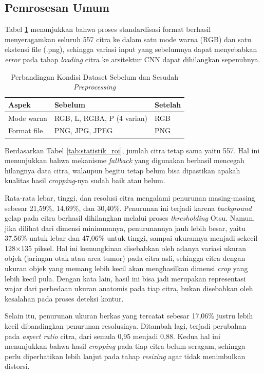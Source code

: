 \subsection{Pemrosesan Umum}
Tabel \ref{tab:preprocessing} menunjukkan bahwa proses standardisasi format berhasil menyeragamkan seluruh 557 citra ke dalam satu mode warna (RGB) dan satu ekstensi file (.png), sehingga variasi input yang sebelumnya dapat menyebabkan \textit{error} pada tahap \textit{loading} citra ke arsitektur CNN dapat dihilangkan sepenuhnya.

\begin{table}[htbp]
	\centering
	\caption{Perbandingan Kondisi Dataset Sebelum dan Sesudah \textit{Preprocessing}}
	\label{tab:preprocessing}
	\begin{tabular}{|l|l|l|}
		\hline
		\textbf{Aspek} & \textbf{Sebelum} & \textbf{Setelah} \\ \hline
		Mode warna & RGB, L, RGBA, P (4 varian) & RGB \\ \hline
		Format file & PNG, JPG, JPEG & PNG \\ \hline
	\end{tabular}
\end{table}

Berdasarkan Tabel \ref{tab:statistik_roi}, jumlah citra tetap sama yaitu 557. Hal ini menunjukkan bahwa mekanisme \textit{fallback} yang digunakan berhasil mencegah hilangnya data citra, walaupun begitu tetap belum bisa dipastikan apakah kualitas hasil \textit{cropping}-nya sudah baik atau belum.

Rata-rata lebar, tinggi, dan resolusi citra mengalami penurunan masing-masing sebesar 21,59\%, 14,69\%, dan 30,40\%. Penurunan ini terjadi karena \textit{background} gelap pada citra berhasil dihilangkan melalui proses \textit{thresholding} Otsu. Namun, jika dilihat dari dimensi minimumnya, penurunannya jauh lebih besar, yaitu 37,56\% untuk lebar dan 47,06\% untuk tinggi, sampai ukurannya menjadi sekecil 128×135 piksel. Hal ini kemungkinan disebabkan oleh adanya variasi ukuran objek (jaringan otak atau area tumor) pada citra asli, sehingga citra dengan ukuran objek yang memang lebih kecil akan menghasilkan dimensi \textit{crop} yang lebih kecil pula. Dengan kata lain, hasil ini bisa jadi merupakan representasi wajar dari perbedaan ukuran anatomis pada tiap citra, bukan disebabkan oleh kesalahan pada proses deteksi kontur.


Selain itu, penurunan ukuran berkas yang tercatat sebesar 17,06\% justru lebih kecil dibandingkan penurunan resolusinya. Ditambah lagi, terjadi perubahan pada \textit{aspect ratio} citra, dari semula 0,95 menjadi 0,88. Kedua hal ini menunjukkan bahwa hasil \textit{cropping} pada tiap citra belum seragam, sehingga perlu diperhatikan lebih lanjut pada tahap \textit{resizing} agar tidak menimbulkan distorsi.

